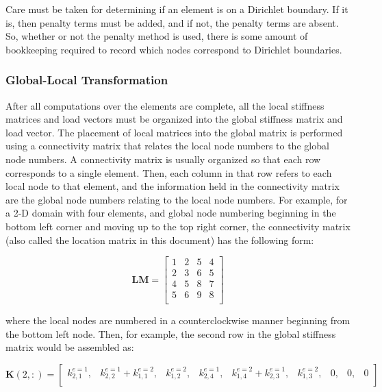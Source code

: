 \documentclass[10pt]{article}
\begin{document}
Care must be taken for determining if an element is on a Dirichlet boundary. If it is, then penalty terms must be added, and if not, the penalty terms are absent. So, whether or not the penalty method is used, there is some amount of bookkeeping required to record which nodes correspond to Dirichlet boundaries.

\subsubsection{Global-Local Transformation}

After all computations over the elements are complete, all the local stiffness matrices and load vectors must be organized into the global stiffness matrix and load vector. The placement of local matrices into the global matrix is performed using a connectivity matrix that relates the local node numbers to the global node numbers. A connectivity matrix is usually organized so that each row corresponds to a single element. Then, each column in that row refers to each local node to that element, and the information held in the connectivity matrix are the global node numbers relating to the local node numbers. For example, for a 2-D domain with four elements, and global node numbering beginning in the bottom left corner and moving up to the top right corner, the connectivity matrix (also called the location matrix in this document) has the following form:

\begin{equation}
\textbf{LM}=\begin{bmatrix}
1 & 2 & 5 & 4\\
2 & 3 & 6 & 5\\
4 & 5 & 8 & 7\\
5 & 6 & 9 & 8\\
\end{bmatrix}
\end{equation}

where the local nodes are numbered in a counterclockwise manner beginning from the bottom left node. Then, for example, the second row in the global stiffness matrix would be assembled as:

\begin{equation}
\textbf{K}(2,:)=\begin{bmatrix}
k_{2,1}^{e=1}, & k_{2,2}^{e=1}+k_{1,1}^{e=2}, & k_{1,2}^{e=2}, & k_{2,4}^{e=1}, & k_{1,4}^{e=2}+k_{2,3}^{e=1}, & k_{1,3}^{e=2}, & 0, & 0, & 0\\
\end{bmatrix}
\end{equation}
\end{document}
